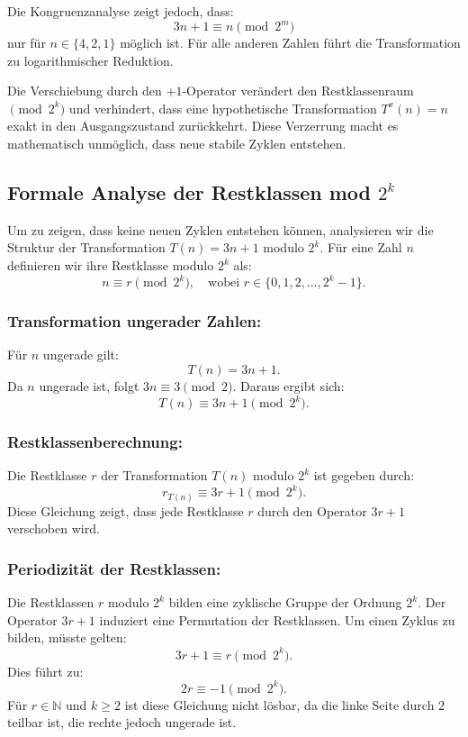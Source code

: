 \documentclass[a4paper,12pt]{article}
\begin{document}
Die Kongruenzanalyse zeigt jedoch, dass:
\[
3n + 1 \equiv n \pmod{2^m}
\]
nur für \( n \in \{4, 2, 1\} \) möglich ist. Für alle anderen Zahlen führt die Transformation zu logarithmischer Reduktion.

Die Verschiebung durch den \(+1\)-Operator verändert den Restklassenraum \(\pmod{2^k}\) und verhindert, dass eine hypothetische Transformation \( T^x(n) = n \) exakt in den Ausgangszustand zurückkehrt. Diese Verzerrung macht es mathematisch unmöglich, dass neue stabile Zyklen entstehen.

\subsection{Formale Analyse der Restklassen mod \( 2^k \)}
Um zu zeigen, dass keine neuen Zyklen entstehen können, analysieren wir die Struktur der Transformation \( T(n) = 3n + 1 \) modulo \( 2^k \). Für eine Zahl \( n \) definieren wir ihre Restklasse modulo \( 2^k \) als:
\[
n \equiv r \pmod{2^k}, \quad \text{wobei } r \in \{0, 1, 2, \dots, 2^k - 1\}.
\]

\subsubsection{Transformation ungerader Zahlen:}
   Für \( n \) ungerade gilt:
   \[
   T(n) = 3n + 1.
   \]
   Da \( n \) ungerade ist, folgt \( 3n \equiv 3 \pmod{2} \). Daraus ergibt sich:
   \[
   T(n) \equiv 3n + 1 \pmod{2^k}.
   \]

\subsubsection{Restklassenberechnung:}
   Die Restklasse \( r \) der Transformation \( T(n) \) modulo \( 2^k \) ist gegeben durch:
   \[
   r_{T(n)} \equiv 3r + 1 \pmod{2^k}.
   \]
   Diese Gleichung zeigt, dass jede Restklasse \( r \) durch den Operator \( 3r + 1 \) verschoben wird.

\subsubsection{Periodizität der Restklassen:}
   Die Restklassen \( r \) modulo \( 2^k \) bilden eine zyklische Gruppe der Ordnung \( 2^k \). Der Operator \( 3r + 1 \) induziert eine Permutation der Restklassen. Um einen Zyklus zu bilden, müsste gelten:
   \[
   3r + 1 \equiv r \pmod{2^k}.
   \]
   Dies führt zu:
   \[
   2r \equiv -1 \pmod{2^k}.
   \]
   Für \( r \in \mathbb{N} \) und \( k \geq 2 \) ist diese Gleichung nicht lösbar, da die linke Seite durch \( 2 \) teilbar ist, die rechte jedoch ungerade ist.
\end{document}
